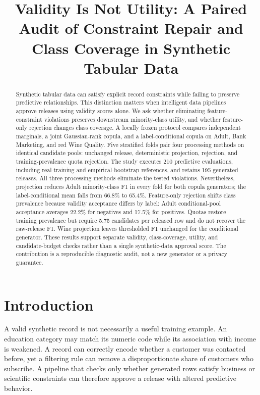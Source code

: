 \documentclass{svproc}
\begin{document}
\mainmatter
\title{Validity Is Not Utility: A Paired Audit of Constraint Repair and Class Coverage in Synthetic Tabular Data}
\author{}\authorrunning{}\institute{}
\maketitle
\begin{abstract}
Synthetic tabular data can satisfy explicit record constraints while failing to preserve predictive relationships. This distinction matters when intelligent data pipelines approve releases using validity scores alone. We ask whether eliminating feature-constraint violations preserves downstream minority-class utility, and whether feature-only rejection changes class coverage. A locally frozen protocol compares independent marginals, a joint Gaussian-rank copula, and a label-conditional copula on Adult, Bank Marketing, and red Wine Quality. Five stratified folds pair four processing methods on identical candidate pools: unchanged release, deterministic projection, rejection, and training-prevalence quota rejection. The study executes 210 predictive evaluations, including real-training and empirical-bootstrap references, and retains 195 generated releases. All three processing methods eliminate the tested violations. Nevertheless, projection reduces Adult minority-class F1 in every fold for both copula generators; the label-conditional mean falls from 66.8\% to 65.4\%. Feature-only rejection shifts class prevalence because validity acceptance differs by label: Adult conditional-pool acceptance averages 22.2\% for negatives and 17.5\% for positives. Quotas restore training prevalence but require 5.75 candidates per released row and do not recover the raw-release F1. Wine projection leaves thresholded F1 unchanged for the conditional generator. These results support separate validity, class-coverage, utility, and candidate-budget checks rather than a single synthetic-data approval score. The contribution is a reproducible diagnostic audit, not a new generator or a privacy guarantee.
\end{abstract}

\section{Introduction}
A valid synthetic record is not necessarily a useful training example. An education category may match its numeric code while its association with income is weakened. A record can correctly encode whether a customer was contacted before, yet a filtering rule can remove a disproportionate share of customers who subscribe. A pipeline that checks only whether generated rows satisfy business or scientific constraints can therefore approve a release with altered predictive behavior.
\end{document}
